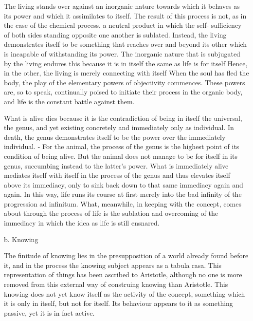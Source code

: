 The living stands over against an inorganic nature towards which it
behaves as its power and which it assimilates to itself. The result of this process
is not, as in the case of the chemical process, a neutral product in which the self-
sufficiency of both sides standing opposite one another is sublated. Instead, the
living demonstrates itself to be something that reaches over and beyond its other
which is incapable of withstanding its power. The
inorganic nature that is subjugated by the living endures this because it is in itself
the same as life is for itself Hence, in the other, the living is merely connecting
with itself When the soul has fled the body, the play of the elementary powers
of objectivity commences. These powers are, so to speak, continually poised to
initiate their process in the organic body, and life is the constant battle against
them.

What is alive dies because it is the contradiction of being in itself
the universal, the genus, and yet existing concretely and immediately only as
individual. In death, the genus demonstrates itself to be the power over the
immediately individual. - For the animal, the process of the genus is the highest
point of its condition of being alive. But the animal does not manage to be for
itself in its genus, succumbing instead to the latter's power. What is immediately
alive mediates itself with itself in the process of the genus and thus elevates itself
above its immediacy, only to sink back down to that same immediacy again and
again. In this way, life runs its course at first merely into the bad infinity of the
progression ad infinitum. What, meanwhile, in keeping with the concept, comes
about through the process of life is the sublation and overcoming of the immediacy
in which the idea as life is still ensnared.

b. Knowing

The finitude of knowing lies in the presupposition of a world already found before it,
and in the process the knowing subject appears as a tabula rasa.
This representation of things has been ascribed to Aristotle, although no one is
more removed from this external way of construing knowing than Aristotle.
This knowing does not yet know itself as the activity of the concept,
something which it is only in itself, but not for itself.
Its behaviour appears to it as something passive, yet it is in fact active.

